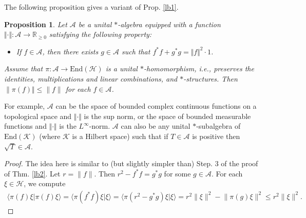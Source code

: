 \documentclass[12pt,b5paper,notitlepage]{article}
\theoremstyle{definition}
\newtheorem{df}{Definition}[section]
\theoremstyle{plain}
\newtheorem{pp}[df]{Proposition}
\newcommand{\mc}{\mathcal}
\newcommand{\End}{\mathrm{End}} %
\newcommand{\bk}[1]{\langle {#1}\rangle}
\newcommand{\scr}{\mathscr}
\newcommand{\Cbb}{\mathbb C}
\newcommand{\Rbb}{\mathbb R}
\numberwithin{equation}{section}
\begin{document}

\begin{comment}
\begin{df}
A (complex) \textbf{normed unital $*$-algebra} is a unital $\Cbb$-algebra $\scr A$ equipped with an involution $*$ (i.e. $*:\scr A\rightarrow\scr A$ is an antilinear bijective map satisfying $a^{**}=a$, $(ab)^*=b^*a^*$, and $1^*=1$ for all $a,b\in\scr A$) and a function $\Vert\cdot\Vert:\scr A\rightarrow\Rbb_{\geq0}$ such that $(\scr A,\Vert\cdot\Vert)$ is a normed vector space, $\Vert 1\Vert=1$, and $\Vert ab\Vert\leq\Vert a\Vert\cdot\Vert b\Vert$ for all $a,b\in\scr A$.
\end{df}
\end{comment}



The following proposition gives a variant of Prop. \ref{lb1}.

\begin{pp}\label{lb46}
Let $\scr A$ be a unital $*$-algebra equipped with a function $\Vert\cdot\Vert:\scr A\rightarrow\Rbb_{\geq0}$ satisfying the following property:
\begin{itemize}
\item If $f\in\scr A$, then there exists $g\in\scr A$ such that $f^*f+g^*g=\Vert f\Vert^2\cdot 1$.
\end{itemize}
Assume that $\pi:\scr A\rightarrow\End(\mc H)$ is a unital $*$-homomorphism, i.e., preserves the identities, multiplications and linear combinations, and $*$-structures. Then $\lVert \pi(f)\Vert\leq \lVert f\lVert$ for each $f\in \scr A$. 
\end{pp}

For example, $\scr A$ can be the space of bounded complex continuous functions on a topological space and $\Vert \cdot\Vert$ is the sup norm, or the space of bounded measurable functions and $\Vert \cdot\Vert$ is the $L^\infty$-norm. $\scr A$ can also be any unital $*$-subalgebra of $\End(\mc K)$ (where $\mc K$ is a Hilbert space) such that if $T\in\scr A$ is positive then $\sqrt T\in\scr A$. 


\begin{proof}
The idea here is similar to (but slightly simpler than) Step. 3 of the proof of Thm. \ref{lb2}.	Let $r=\lVert f\lVert$. Then $r^2-f^*f=g^*g$ for some $g\in\scr A$. For each $\xi\in\mc H$, we compute
	\begin{align*}
		\bk{\pi(f)\xi|\pi(f)\xi}=\bk{\pi(f^*f)\xi|\xi} =\bk{\pi(r^2-g^*g)\xi|\xi}=r^2\lVert\xi\lVert^2-\lVert\pi(g)\xi\lVert^2\leq r^2\lVert\xi\lVert^2.
	\end{align*}
\end{proof}
\end{document}
